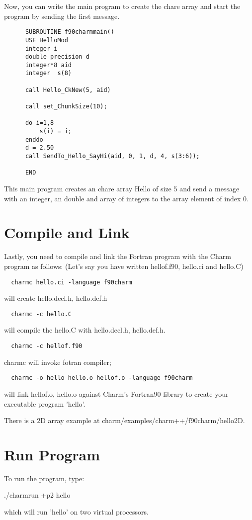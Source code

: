 \documentclass[11pt]{article}
\begin{document}
Now, you can write the main program to create the chare array and start the 
program by sending the first message.
\begin{verbatim}
      SUBROUTINE f90charmmain()
      USE HelloMod
      integer i
      double precision d
      integer*8 aid
      integer  s(8)

      call Hello_CkNew(5, aid)

      call set_ChunkSize(10);

      do i=1,8
          s(i) = i;
      enddo
      d = 2.50
      call SendTo_Hello_SayHi(aid, 0, 1, d, 4, s(3:6));

      END
\end{verbatim}
This main program creates an chare array Hello of size 5 and send a message with
an integer, an double and array of integers to the array element of index 0.

\section{Compile and Link}
Lastly, you need to compile and link the Fortran program with the
Charm program as follows: (Let's say you have written hellof.f90, 
hello.ci and hello.C)
\begin{verbatim}
  charmc hello.ci -language f90charm
\end{verbatim}
    will create hello.decl.h, hello.def.h

\begin{verbatim}
  charmc -c hello.C
\end{verbatim}
    will compile the hello.C with hello.decl.h, hello.def.h.

\begin{verbatim}
  charmc -c hellof.f90
\end{verbatim}
    charmc will invoke fotran compiler;

\begin{verbatim}
  charmc -o hello hello.o hellof.o -language f90charm
\end{verbatim}
    will link hellof.o, hello.o against Charm's Fortran90 library
    to create your executable program 'hello'.

  There is a 2D array example at charm/examples/charm++/f90charm/hello2D.

\section{Run Program}

To run the program, type:

./charmrun +p2 hello

which will run 'hello' on two virtual processors.
\end{document}
